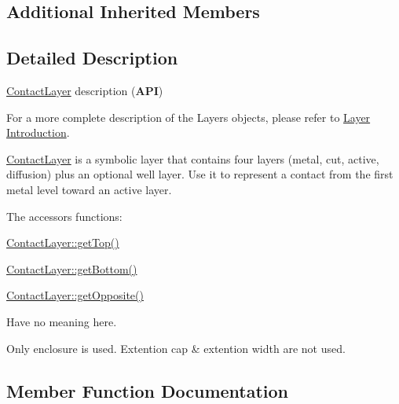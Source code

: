\subsection*{Additional Inherited Members}


\subsection{Detailed Description}
\hyperlink{classHurricane_1_1ContactLayer}{Contact\+Layer} description ({\bfseries A\+PI}) 

For a more complete description of the Layers objects, please refer to \hyperlink{classHurricane_1_1Layer_secLayerIntro}{Layer Introduction}.

\hyperlink{classHurricane_1_1ContactLayer}{Contact\+Layer} is a symbolic layer that contains four layers (metal, cut, active, diffusion) plus an optional well layer. Use it to represent a contact from the first metal level toward an active layer.

The accessors functions\+: 
\begin{DoxyItemize}
\item \hyperlink{classHurricane_1_1Layer_a5f7c43a29f3dd02a9ebccbcbf91d6727}{Contact\+Layer\+::get\+Top()} 
\item \hyperlink{classHurricane_1_1Layer_a4dab4552a219d2d900ed0b1245dc6580}{Contact\+Layer\+::get\+Bottom()} 
\item \hyperlink{classHurricane_1_1Layer_a69e76c09a56260169c4f5c145a35a47f}{Contact\+Layer\+::get\+Opposite()} 
\end{DoxyItemize}Have no meaning here.

Only enclosure is used. Extention cap \& extention width are not used. 

\subsection{Member Function Documentation}
\mbox{\label{classHurricane_1_1ContactLayer_ab5f2e78865e0311fcabf25e1aa94bf09}} 
